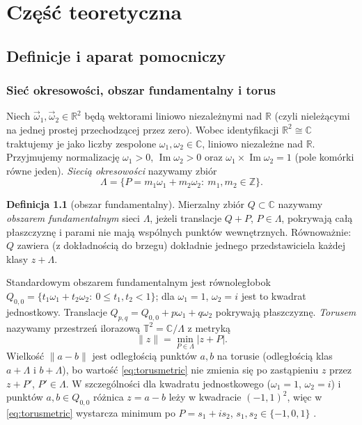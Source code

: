 \documentclass[12pt,a4paper,twoside,openright]{report}
\theoremstyle{definition}
\newtheorem{definicja}{Definicja}[chapter]
\theoremstyle{remark}
\newcommand{\R}{\mathbb{R}}
\newcommand{\C}{\mathbb{C}}
\newcommand{\Z}{\mathbb{Z}}
\newcommand{\T}{\mathbb{T}}
\renewcommand{\Im}{\operatorname{Im}}
\begin{document}
\part{Część teoretyczna}



\chapter{Definicje i aparat pomocniczy}\label{sec:def}

\section{Sieć okresowości, obszar fundamentalny i torus}\label{ssec:lattice}

Niech $\vec\omega_1,\vec\omega_2\in\R^2$ będą wektorami liniowo niezależnymi nad $\R$ (czyli nieleżącymi na jednej prostej przechodzącej przez zero). Wobec identyfikacji $\R^2\cong\C$ traktujemy je jako liczby zespolone $\omega_1,\omega_2\in\C$, liniowo niezależne nad $\R$. Przyjmujemy normalizację $\omega_1>0$, $\Im\omega_2>0$ oraz $\omega_1\times\Im\omega_2=1$ (pole komórki równe jeden). \emph{Siecią okresowości} nazywamy zbiór
\begin{equation}\label{eq:lattice}
\Lambda=\{P=m_1\omega_1+m_2\omega_2:\ m_1,m_2\in\Z\}.
\end{equation}

\begin{definicja}[obszar fundamentalny]\label{def:fund}
Mierzalny zbiór $Q\subset\C$ nazywamy \emph{obszarem fundamentalnym} sieci $\Lambda$, jeżeli translacje $Q+P$, $P\in\Lambda$, pokrywają całą płaszczyznę i parami nie mają wspólnych punktów wewnętrznych. Równoważnie: $Q$ zawiera (z dokładnością do brzegu) dokładnie jednego przedstawiciela każdej klasy $z+\Lambda$.
\end{definicja}

Standardowym obszarem fundamentalnym jest równoległobok $Q_{0,0}=\{t_1\omega_1+t_2\omega_2:\ 0\le t_1,t_2<1\}$; dla $\omega_1=1$, $\omega_2=i$ jest to kwadrat jednostkowy. Translacje $Q_{p,q}=Q_{0,0}+p\omega_1+q\omega_2$ pokrywają płaszczyznę. \emph{Torusem} nazywamy przestrzeń ilorazową $\T^2=\C/\Lambda$ z metryką
\begin{equation}\label{eq:torusmetric}
\|z\|=\min_{P\in\Lambda}|z+P|.
\end{equation}
Wielkość $\|a-b\|$ jest odległością punktów $a,b$ na torusie (odległością klas $a+\Lambda$ i $b+\Lambda$), bo wartość \eqref{eq:torusmetric} nie zmienia się po zastąpieniu $z$ przez $z+P'$, $P'\in\Lambda$. W szczególności dla kwadratu jednostkowego ($\omega_1=1$, $\omega_2=i$) i punktów $a,b\in Q_{0,0}$ różnica $z=a-b$ leży w kwadracie $(-1,1)^2$, więc w \eqref{eq:torusmetric} wystarcza minimum po $P=s_1+is_2$, $s_1,s_2\in\{-1,0,1\}$ \cite{czapla2025computational}.
\end{document}
